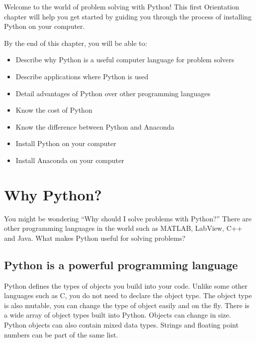 \documentclass{book}
\begin{document}
    
        Welcome to the world of problem solving with Python! This first
Orientation chapter will help you get started by guiding you through the
process of installing Python on your computer.
    




    
        By the end of this chapter, you will be able to:

\begin{itemize}
\item
  Describe why Python is a useful computer language for problem solvers
\item
  Describe applications where Python is used
\item
  Detail advantages of Python over other programming languages
\item
  Know the cost of Python
\item
  Know the difference between Python and Anaconda
\item
  Install Python on your computer
\item
  Install Anaconda on your computer
\end{itemize}
        \newpage

    




    
        \hypertarget{why-python}{%
\section{Why Python?}\label{why-python}}
    




    
        You might be wondering ``Why should I solve problems with Python?''
There are other programming languages in the world such as MATLAB,
LabView, C++ and Java. What makes Python useful for solving problems?
    




    
        \hypertarget{python-is-a-powerful-programming-language}{%
\subsection{Python is a powerful programming
language}\label{python-is-a-powerful-programming-language}}

Python defines the types of objects you build into your code. Unlike
some other languages such as C, you do not need to declare the object
type. The object type is also mutable, you can change the type of object
easily and on the fly. There is a wide array of object types built into
Python. Objects can change in size. Python objects can also contain
mixed data types. Strings and floating point numbers can be part of the
same list.
\end{document}
